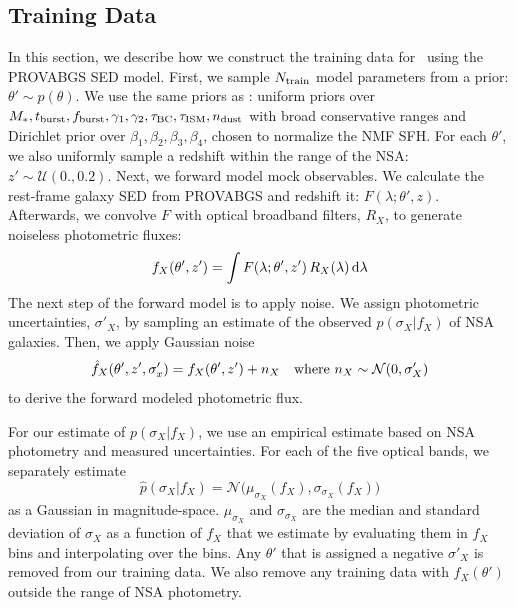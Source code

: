 \subsection{Training Data} \label{sec:training}
In this section, we describe how we construct the training data for
\sedflow~using the PROVABGS SED model.
First, we sample $N_{\rm train}$ model parameters from a prior: $\theta'\sim p(\theta)$. 
We use the same priors as \cite{hahn2022}: uniform priors over $M_*,
t_{\rm burst}, f_{\rm burst}, \gamma_1, \gamma_2, \tau_{\rm BC}, \tau_{\rm ISM},
n_{\rm dust}$ with broad conservative ranges and Dirichlet prior over $\beta_1,
\beta_2, \beta_3, \beta_4$, chosen to normalize the NMF SFH.
For each $\theta'$, we also uniformly sample a redshift within the range of the
NSA: $z' \sim \mathcal{U}(0., 0.2)$. 
Next, we forward model mock observables. 
We calculate the rest-frame galaxy SED from PROVABGS and redshift it: 
$F(\lambda;\theta', z)$. 
Afterwards, we convolve $F$ with optical broadband filters, $R_X$, to generate
noiseless photometric fluxes:
\begin{equation}
    f_X(\theta', z') = \int F(\lambda;\theta', z') \, R_X(\lambda) \, {\rm d}\lambda
\end{equation}
The next step of the forward model is to apply noise. 
We assign photometric uncertainties, $\sigma'_X$, by sampling an estimate of
the observed $p(\sigma_X | f_X)$ of NSA galaxies. 
Then, we apply Gaussian noise
\begin{equation} \label{eq:noise} 
    \hat{f}_X(\theta', z', \sigma'_x) = f_X(\theta', z') + n_X  \quad {\rm where}~n_X \sim \mathcal{N}(0, \sigma'_X)
\end{equation}
to derive the forward modeled photometric flux.

For our estimate of $p(\sigma_X | f_X)$, we use an empirical estimate based on
NSA photometry and measured uncertainties. 
For each of the five optical bands, we separately estimate  
\begin{equation}
    \hat{p}(\sigma_X | f_X) = \mathcal{N} \big( \mu_{\sigma_X}(f_X),
    \sigma_{\sigma_X}(f_X) \big)
\end{equation}
as a Gaussian in magnitude-space. 
$\mu_{\sigma_X}$ and $\sigma_{\sigma_X}$ are the median and standard deviation
of $\sigma_X$ as a function of $f_X$ that we estimate by evaluating them in
$f_X$ bins and interpolating over the bins. 
Any $\theta'$ that is assigned a negative $\sigma'_X$ is removed from our
training data. 
We also remove any training data with $f_X(\theta')$ outside the range of NSA
photometry. 

